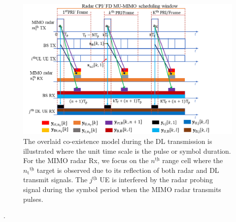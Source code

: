 \documentclass[9pt,journal]{IEEEtran}
\newcommand{\ith}[1]    {{#1}^{\underline{\text{th}}}}
\begin{document}
\begin{figure}[!t]
		\centering
		\includegraphics[width=1.0\columnwidth]{systemmodel.png}
		\caption{The overlaid co-existence model during the DL transmission is illustrated where the unit time scale is the pulse or symbol duration. For the MIMO radar Rx, we focus on the $\ith{n}$ range cell where the $\ith{n_\mathrm{t}}$ target is observed due to its reflection of both radar and DL transmit signals. The $\ith{j}$ UE is interfered by the radar probing signal during the symbol period when the MIMO radar transmits pulses.} 
		\vspace{-1em}
		\label{fig:systemmodel}
	\end{figure} . %
\end{document}
